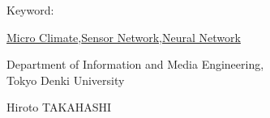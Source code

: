 \begin{flushleft}Keyword:\\
\end{flushleft}
{\underline{Micro Climate},\underline{Sensor Network},\underline{Neural Network}}

\begin{flushright}
\vspace{10mm}

\vspace{5mm}
\large Department of Information and Media Engineering,\\
Tokyo Denki University\\
\begin{flushright}\LARGE Hiroto TAKAHASHI\\
\end{flushright}

\end{flushright}

